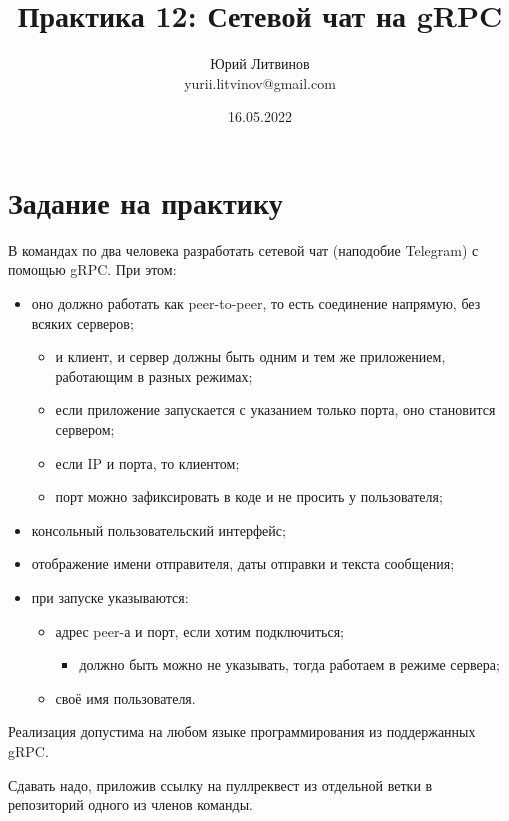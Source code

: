\documentclass[a5paper]{article}
\title{Практика 12: Сетевой чат на gRPC}
\author{Юрий Литвинов\\\small{yurii.litvinov@gmail.com}}
\date{16.05.2022}
\begin{document}
\maketitle
\thispagestyle{empty}

\section{Задание на практику}

В командах по два человека разработать сетевой чат (наподобие Telegram) с помощью gRPC. При этом:

\begin{itemize}
    \item оно должно работать как peer-to-peer, то есть соединение напрямую, без всяких серверов;
    \begin{itemize}
        \item и клиент, и сервер должны быть одним и тем же приложением, работающим в разных режимах;
        \item если приложение запускается с указанием только порта, оно становится сервером;
        \item если IP и порта, то клиентом;
        \item порт можно зафиксировать в коде и не просить у пользователя;
    \end{itemize}
    \item консольный пользовательский интерфейс;
    \item отображение имени отправителя, даты отправки и текста сообщения;
    \item при запуске указываются:
    \begin{itemize}
        \item адрес peer-а и порт, если хотим подключиться;
        \begin{itemize}
            \item должно быть можно не указывать, тогда работаем в режиме сервера;
        \end{itemize}
        \item своё имя пользователя.
    \end{itemize}
\end{itemize}

Реализация допустима на любом языке программирования из поддержанных gRPC.

Сдавать надо, приложив ссылку на пуллреквест из отдельной ветки в репозиторий одного из членов команды.
\end{document}
